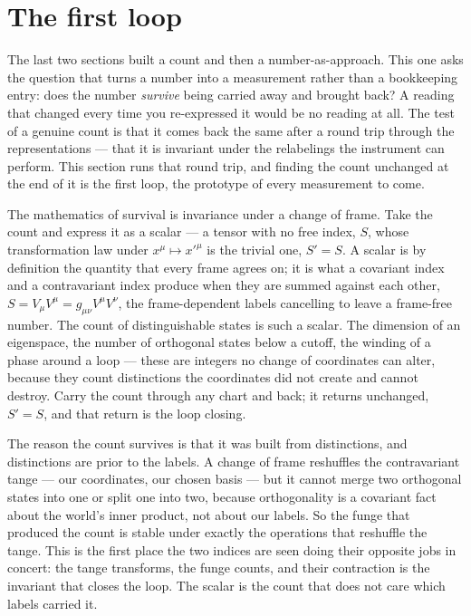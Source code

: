 \section{The first loop}

The last two sections built a count and then a number-as-approach. This one asks the question that turns a number into a
measurement rather than a bookkeeping entry: does the number \emph{survive} being carried away and brought back? A reading
that changed every time you re-expressed it would be no reading at all. The test of a genuine count is that it comes back the
same after a round trip through the representations --- that it is invariant under the relabelings the instrument can
perform. This section runs that round trip, and finding the count unchanged at the end of it is the first loop, the
prototype of every measurement to come.

The mathematics of survival is invariance under a change of frame. Take the count and express it as a scalar --- a tensor
with no free index, $S$, whose transformation law under $x^\mu \mapsto x'^\mu$ is the trivial one, $S' = S$. A scalar is by
definition the quantity that every frame agrees on; it is what a covariant index and a contravariant index produce when they
are summed against each other, $S = V_\mu V^\mu = g_{\mu\nu} V^\mu V^\nu$, the frame-dependent labels cancelling to leave a
frame-free number. The count of distinguishable states is such a scalar. The dimension of an eigenspace, the number of
orthogonal states below a cutoff, the winding of a phase around a loop --- these are integers no change of coordinates can
alter, because they count distinctions the coordinates did not create and cannot destroy. Carry the count through any chart
and back; it returns unchanged, $S' = S$, and that return is the loop closing.

The reason the count survives is that it was built from distinctions, and distinctions are prior to the labels. A change of
frame reshuffles the contravariant tange --- our coordinates, our chosen basis --- but it cannot merge two orthogonal states
into one or split one into two, because orthogonality is a covariant fact about the world's inner product, not about our
labels. So the funge that produced the count is stable under exactly the operations that reshuffle the tange. This is the
first place the two indices are seen doing their opposite jobs in concert: the tange transforms, the funge counts, and their
contraction is the invariant that closes the loop. The scalar is the count that does not care which labels carried it.

